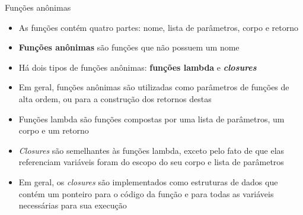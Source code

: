 \begin{frame}[fragile]{Funções anônimas}

    \begin{itemize}
        \item As funções contém quatro partes: nome, lista de parâmetros, corpo e retorno

        \item \textbf{Funções anônimas} são funções que não possuem um nome

        \item Há dois tipos de funções anônimas: \textbf{funções lambda} e 
            \textbf{\textit{closures}}

        \item Em geral, funções anônimas são utilizadas como parâmetros de funções de alta ordem,
            ou para a construção dos retornos destas

        \item Funções lambda são funções compostas por uma lista de parâmetros, um corpo e um
            retorno

        \item \textit{Closures} são semelhantes às funções lambda, exceto pelo fato de que elas
            referenciam variáveis foram do escopo do seu corpo e lista de parâmetros

        \item Em geral, os \textit{closures} são implementados como estruturas de dados que
            contém um ponteiro para o código da função e para todas as variáveis necessárias para
            sua execução
    \end{itemize}

\end{frame}
